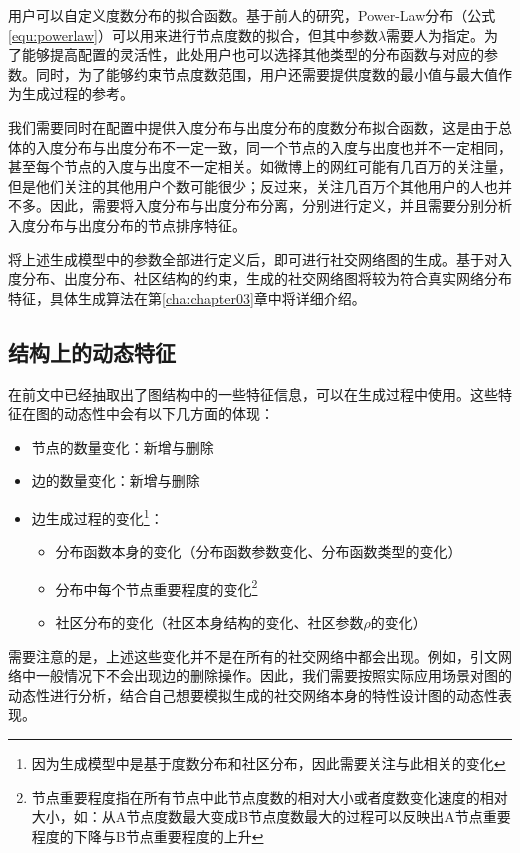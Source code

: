 用户可以自定义度数分布的拟合函数。基于前人的研究，Power-Law分布（公式\ref{equ:powerlaw}）可以用来进行节点度数的拟合，但其中参数$\lambda$需要人为指定。为了能够提高配置的灵活性，此处用户也可以选择其他类型的分布函数与对应的参数。同时，为了能够约束节点度数范围，用户还需要提供度数的最小值与最大值作为生成过程的参考。

我们需要同时在配置中提供入度分布与出度分布的度数分布拟合函数，这是由于总体的入度分布与出度分布不一定一致，同一个节点的入度与出度也并不一定相同，甚至每个节点的入度与出度不一定相关。如微博上的网红可能有几百万的关注量，但是他们关注的其他用户个数可能很少；反过来，关注几百万个其他用户的人也并不多。因此，需要将入度分布与出度分布分离，分别进行定义，并且需要分别分析入度分布与出度分布的节点排序特征。

将上述生成模型中的参数全部进行定义后，即可进行社交网络图的生成。基于对入度分布、出度分布、社区结构的约束，生成的社交网络图将较为符合真实网络分布特征，具体生成算法在第\ref{cha:chapter03}章中将详细介绍。

\subsection{结构上的动态特征}

在前文中已经抽取出了图结构中的一些特征信息，可以在生成过程中使用。这些特征在图的动态性中会有以下几方面的体现：

\begin{itemize}
    \item 节点的数量变化：新增与删除
    \item 边的数量变化：新增与删除
    \item 边生成过程的变化\footnote{因为生成模型中是基于度数分布和社区分布，因此需要关注与此相关的变化}：
    \begin{itemize}
        \item 分布函数本身的变化（分布函数参数变化、分布函数类型的变化）
        \item 分布中每个节点重要程度的变化\footnote{节点重要程度指在所有节点中此节点度数的相对大小或者度数变化速度的相对大小，如：从A节点度数最大变成B节点度数最大的过程可以反映出A节点重要程度的下降与B节点重要程度的上升}
        \item 社区分布的变化（社区本身结构的变化、社区参数$\rho$的变化）
    \end{itemize}
\end{itemize}

\vspace{0.2cm}

需要注意的是，上述这些变化并不是在所有的社交网络中都会出现。例如，引文网络中一般情况下不会出现边的删除操作。因此，我们需要按照实际应用场景对图的动态性进行分析，结合自己想要模拟生成的社交网络本身的特性设计图的动态性表现。

